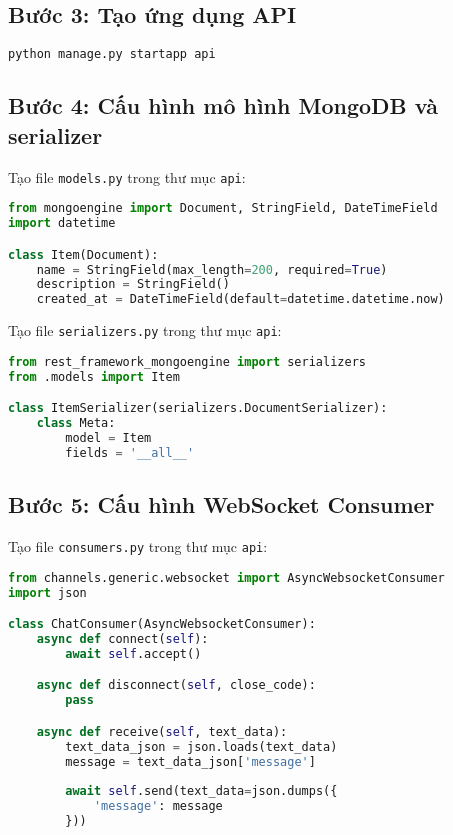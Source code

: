 \documentclass[12pt,a4paper]{article}
\begin{document}
\subsection{Bước 3: Tạo ứng dụng API}

\begin{lstlisting}[language=bash]
python manage.py startapp api
\end{lstlisting}

\subsection{Bước 4: Cấu hình mô hình MongoDB và serializer}

Tạo file \texttt{models.py} trong thư mục \texttt{api}:

\begin{lstlisting}[language=python]
from mongoengine import Document, StringField, DateTimeField
import datetime

class Item(Document):
    name = StringField(max_length=200, required=True)
    description = StringField()
    created_at = DateTimeField(default=datetime.datetime.now)
\end{lstlisting}

Tạo file \texttt{serializers.py} trong thư mục \texttt{api}:

\begin{lstlisting}[language=python]
from rest_framework_mongoengine import serializers
from .models import Item

class ItemSerializer(serializers.DocumentSerializer):
    class Meta:
        model = Item
        fields = '__all__'
\end{lstlisting}

\subsection{Bước 5: Cấu hình WebSocket Consumer}

Tạo file \texttt{consumers.py} trong thư mục \texttt{api}:

\begin{lstlisting}[language=python]
from channels.generic.websocket import AsyncWebsocketConsumer
import json

class ChatConsumer(AsyncWebsocketConsumer):
    async def connect(self):
        await self.accept()

    async def disconnect(self, close_code):
        pass

    async def receive(self, text_data):
        text_data_json = json.loads(text_data)
        message = text_data_json['message']
        
        await self.send(text_data=json.dumps({
            'message': message
        }))
\end{lstlisting}
\end{document}
